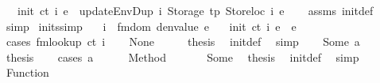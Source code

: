 \begin{isabellebody}
\ \ \ {\isachardoublequoteopen}init\ ct\ i\ e\ {\isacharequal}{\kern0pt}\ updateEnvDup\ i\ {\isacharparenleft}{\kern0pt}Storage\ tp{\isacharparenright}{\kern0pt}\ {\isacharparenleft}{\kern0pt}Storeloc\ i{\isacharparenright}{\kern0pt}\ e{\isachardoublequoteclose}\isanewline
%
\isadelimproof
\ \ %
\endisadelimproof
%
\isatagproof
{}\isamarkupfalse%
\ assms\ init{\isacharunderscore}{\kern0pt}def\ \isamarkupfalse%
\ simp%
\endisatagproof
{\isafoldproof}%
%
\isadelimproof
\isanewline
%
\endisadelimproof
\isanewline
{}\isamarkupfalse%
\ init{\isacharunderscore}{\kern0pt}s{}{}{\isacharbrackleft}{\kern0pt}simp{\isacharbrackright}{\kern0pt}{\isacharcolon}{\kern0pt}\isanewline
\ \ \ {\isachardoublequoteopen}i\ {\isacharbar}{\kern0pt}{\isasymin}{\isacharbar}{\kern0pt}\ fmdom\ {\isacharparenleft}{\kern0pt}denvalue\ e{\isacharparenright}{\kern0pt}{\isachardoublequoteclose}\isanewline
\ \ \ {\isachardoublequoteopen}init\ ct\ i\ e\ {\isacharequal}{\kern0pt}\ e{\isachardoublequoteclose}\isanewline
%
\isadelimproof
%
\endisadelimproof
%
\isatagproof
{}\isamarkupfalse%
\ {\isacharparenleft}{\kern0pt}cases\ {\isachardoublequoteopen}fmlookup\ ct\ i{\isachardoublequoteclose}{\isacharparenright}{\kern0pt}\isanewline
\ \ \isamarkupfalse%
\ None\isanewline
\ \ \isamarkupfalse%
\ \isamarkupfalse%
\ {\isacharquery}{\kern0pt}thesis\ \isamarkupfalse%
\ init{\isacharunderscore}{\kern0pt}def\ \isamarkupfalse%
\ simp\isanewline
{}\isamarkupfalse%
\isanewline
\ \ \isamarkupfalse%
\ {\isacharparenleft}{\kern0pt}Some\ a{\isacharparenright}{\kern0pt}\isanewline
\ \ \isamarkupfalse%
\ \isamarkupfalse%
\ {\isacharquery}{\kern0pt}thesis\isanewline
\ \ \isamarkupfalse%
\ {\isacharparenleft}{\kern0pt}cases\ a{\isacharparenright}{\kern0pt}\isanewline
\ \ \ \ \isamarkupfalse%
\ {\isacharparenleft}{\kern0pt}Method\ {\isacharunderscore}{\kern0pt}{\isacharparenright}{\kern0pt}\isanewline
\ \ \ \ \isamarkupfalse%
\ Some\ \isamarkupfalse%
\ {\isacharquery}{\kern0pt}thesis\ \isamarkupfalse%
\ init{\isacharunderscore}{\kern0pt}def\ \isamarkupfalse%
\ simp\isanewline
\ \ \isamarkupfalse%
\isanewline
\ \ \ \ \isamarkupfalse%
\ {\isacharparenleft}{\kern0pt}Function\ {\isacharunderscore}{\kern0pt}{\isacharparenright}{\kern0pt}\isanewline

\end{isabellebody}
